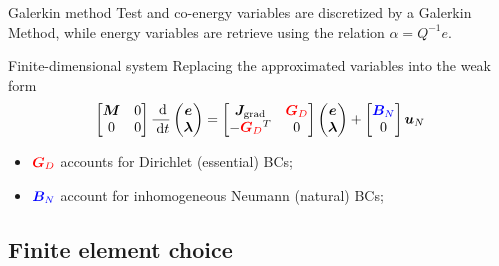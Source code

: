 \documentclass{beamer}
\begin{document}
\begin{frame}{Galerkin method}
Test and co-energy variables are discretized by a Galerkin Method, while energy variables are retrieve using the relation $\alpha = Q^{-1} e$. 
\begin{block}{Finite-dimensional system}
 Replacing the approximated variables into the weak form 
\begin{equation*}
\begin{bmatrix}
\bm{M} & 0 \\
0      & 0 \\
\end{bmatrix} \frac{\d}{\d t}
\begin{pmatrix}
\bm{e}\\
\bm{\lambda} \\
\end{pmatrix}
= \begin{bmatrix}
\bm{J}_{\text{grad}} & \textcolor{red}{\bm{G}_D}\\
-\textcolor{red}{\bm{G}_D}^T & 0 \\
\end{bmatrix}
\begin{pmatrix}
\bm{e}\\
\bm{\lambda} \\
\end{pmatrix} + 
\begin{bmatrix}
\textcolor{blue}{\bm{B}_N}\\
0\\
\end{bmatrix}
\bm{u}_N
\end{equation*}
\begin{itemize}
	\item $\textcolor{red}{\bm{G}_D}$ accounts for Dirichlet (essential) BCs;
	\item $\textcolor{blue}{\bm{B}_N}$ account for inhomogeneous Neumann (natural) BCs;
\end{itemize}
\end{block}

 
\end{frame}

\subsection{Finite element choice}
\end{document}
